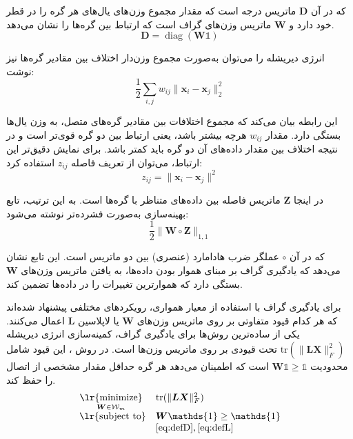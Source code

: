 \documentclass[10pt,twocolumn,a4paper]{article}
\newcommand\minimize[1]{\mathop{\text{\lr{minimize}}}\limits_{#1}\ }
\begin{document}
     که در آن \( \bm{D} \) ماتریس درجه است که مقدار مجموع وزن‌های یال‌های هر گره را در قطر خود دارد و \( \bm{W} \) ماتریس وزن‌های گراف است که ارتباط بین گره‌ها را نشان می‌دهد.
     \begin{equation}\label{eq:defD}
     	\bm{D} = \operatorname{diag}(\bm{W}\mathds{1})
     \end{equation}
     
      انرژی دیریشله را می‌توان به‌صورت مجموع وزن‌دار اختلاف بین مقادیر گره‌ها نیز نوشت:
  \begin{equation}
  	     \frac{1}{2} \sum_{i,j} w_{ij} \|\bm{x}_i - \bm{x}_j\|_2^2
  \end{equation}
     
     این رابطه بیان می‌کند که مجموع اختلافات بین مقادیر گره‌های متصل، به وزن یال‌ها بستگی دارد. مقدار \( w_{ij} \) هرچه بیشتر باشد، یعنی ارتباط بین دو گره قوی‌تر است و در نتیجه اختلاف بین مقدار داده‌های آن دو گره باید کمتر باشد. برای نمایش دقیق‌تر این ارتباط، می‌توان از تعریف فاصله \( z_{ij} \) استفاده کرد:
\begin{equation}
	     z_{ij} = \|\bm{x}_i - \bm{x}_j\|^2
\end{equation}
     
     در اینجا \( \bm{Z} \) ماتریس فاصله بین داده‌های متناظر با گره‌ها است. به این ترتیب، تابع بهینه‌سازی به‌صورت فشرده‌تر نوشته می‌شود:
\begin{equation}
	     \frac{1}{2} \| \bm{W} \circ \bm{Z} \|_{1,1}
\end{equation}
     
     که در آن \( \circ \) عملگر ضرب هادامارد (عنصری) بین دو ماتریس است. این تابع نشان می‌دهد که یادگیری گراف بر مبنای هموار بودن داده‌ها، به یافتن ماتریس وزن‌های \( \bm{W} \) بستگی دارد که هموارترین تغییرات را در داده‌ها تضمین کند.
     
     برای یادگیری گراف با استفاده از معیار همواری، رویکردهای مختلفی پیشنهاد شده‌اند که هر کدام قیود متفاوتی بر روی ماتریس وزن‌های \( \bm{W} \) یا لاپلاسین \( \bm{L} \) اعمال می‌کنند. یکی از ساده‌ترین روش‌ها برای یادگیری گراف، کمینه‌سازی انرژی دیریشله \( \text{tr}(\|\bm{L} \bm{X}\|^2_F) \) تحت قیودی بر روی ماتریس وزن‌ها است.
     در روش \cite{Daitch2009}، این قیود شامل محدودیت \( \bm{W} \mathds{1} \geq \mathds{1} \) است که اطمینان می‌دهد هر گره حداقل مقدار مشخصی از اتصال را حفظ کند. 
     \begin{equation}
     		\begin{array}{cl}
     			\minimize{\bm{W}\in\mathcal{W}_m} & \text{tr}(\|\bm{L} \bm{X}\|^2_F) \\
     			\text{\lr{subject to}} & \bm{W} \mathds{1} \ge \mathds{1} \\
     			& \eqref{eq:defD}, \eqref{eq:defL}
     		\end{array}
     \end{equation}
     
\end{document}
